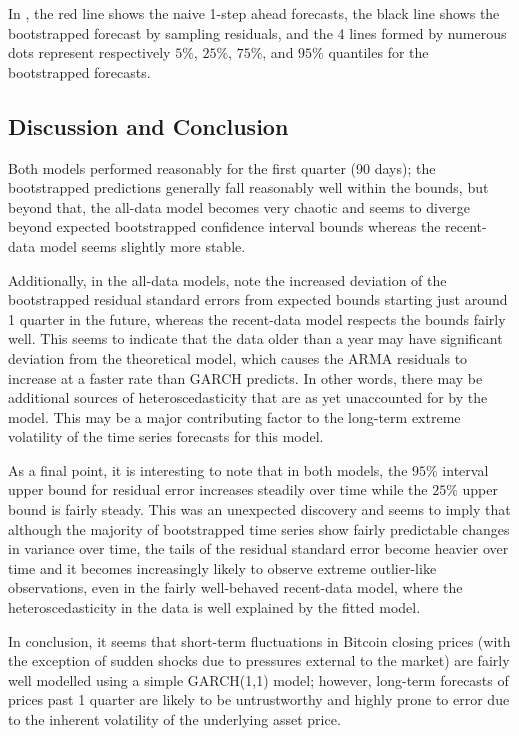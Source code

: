 \documentclass[12pt]{article}
\begin{document}
In , the red line shows the naive 1-step ahead forecasts, the black line shows the bootstrapped forecast by sampling residuals, and the 4 lines formed by numerous dots represent respectively $5\%$, $25\%$, $75\%$, and $95\%$ quantiles for the bootstrapped forecasts.

\subsection{Discussion and Conclusion}

Both models performed reasonably for the first quarter (90 days); the bootstrapped predictions generally fall reasonably well within the bounds, but beyond that, the all-data model becomes very chaotic and seems to diverge beyond expected bootstrapped confidence interval bounds whereas the recent-data model seems slightly more stable.

Additionally, in the all-data models, note the increased deviation of the bootstrapped residual standard errors from expected bounds starting just around 1 quarter in the future, whereas the recent-data model respects the bounds fairly well. This seems to indicate that the data older than a year may have significant deviation from the theoretical model, which causes the ARMA residuals to increase at a faster rate than GARCH predicts. In other words, there may be additional sources of heteroscedasticity that are as yet unaccounted for by the model. This may be a major contributing factor to the long-term extreme volatility of the time series forecasts for this model.

As a final point, it is interesting to note that in both models, the $95\%$ interval upper bound for residual error increases steadily over time while the $25\%$ upper bound is fairly steady. This was an unexpected discovery and seems to imply that although the majority of bootstrapped time series show fairly predictable changes in variance over time, the tails of the residual standard error become heavier over time and it becomes increasingly likely to observe extreme outlier-like observations, even in the fairly well-behaved recent-data model, where the heteroscedasticity in the data is well explained by the fitted model.

In conclusion, it seems that short-term fluctuations in Bitcoin closing prices (with the exception of sudden shocks due to pressures external to the market) are fairly well modelled using a simple GARCH(1,1) model; however, long-term forecasts of prices past 1 quarter are likely to be untrustworthy and highly prone to error due to the inherent volatility of the underlying asset price.
\end{document}

